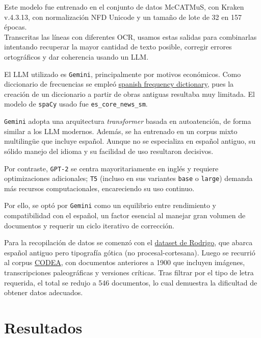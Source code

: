 \documentclass[11pt,a4paper]{article}
\begin{document}
Este modelo fue entrenado en el conjunto de datos McCATMuS, con Kraken v.4.3.13, con normalización NFD Unicode y un tamaño de lote de 32 en 157 épocas.\\


Transcritas las líneas con diferentes OCR, usamos estas salidas para combinarlas intentando recuperar la mayor cantidad de texto posible, corregir errores ortográficos y dar coherencia usando un LLM.

El LLM utilizado es \texttt{Gemini}, principalmente por motivos económicos. Como diccionario de frecuencias se empleó \href{https://github.com/hermitdave/FrequencyWords/blob/master/content/2016/es/es_full.txt}{spanish frequency dictionary}, pues la creación de un diccionario a partir de obras antiguas resultaba muy limitada. El modelo de \texttt{spaCy} usado fue \texttt{es\_core\_news\_sm}.

\texttt{Gemini} adopta una arquitectura \textit{transformer} basada en autoatención, de forma similar a los LLM modernos. Además, se ha entrenado en un corpus mixto multilingüe que incluye español. Aunque no se especializa en español antiguo, su sólido manejo del idioma y su facilidad de uso resultaron decisivos.

Por contraste, \texttt{GPT-2} se centra mayoritariamente en inglés y requiere optimizaciones adicionales; \texttt{T5} (incluso en sus variantes \texttt{base} o \texttt{large}) demanda más recursos computacionales, encareciendo su uso continuo.

Por ello, se optó por \texttt{Gemini} como un equilibrio entre rendimiento y compatibilidad con el español, un factor esencial al manejar gran volumen de documentos y requerir un ciclo iterativo de corrección.

Para la recopilación de datos se comenzó con el \href{https://zenodo.org/records/1490009/files/Rodrigo%20corpus%201.0.0.tar.gz?download=1}{dataset de Rodrigo}, que abarca español antiguo pero tipografía gótica (no procesal-cortesana). Luego se recurrió al corpus \href{https://corpuscodea.es/}{CODEA}, con documentos anteriores a 1900 que incluyen imágenes, transcripciones paleográficas y versiones críticas. Tras filtrar por el tipo de letra requerida, el total se redujo a 546 documentos, lo cual demuestra la dificultad de obtener datos adecuados.\\

\section{Resultados}
\end{document}

